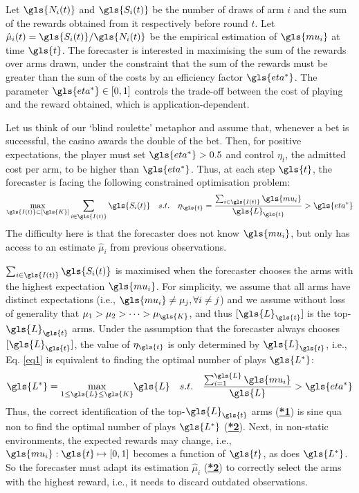 Let $\gls{N_i(t)}$ and $\gls{S_i(t)}$ be the number of draws of arm $i$ and the sum of the rewards obtained from it respectively before round $t$. Let $\hat{\mu}_i(t) = \gls{S_i(t)}/\gls{N_i(t)}$ be the empirical estimation of $\gls{mu_i}$ at time $\gls{t}$. 
The forecaster is interested in maximising the sum of the rewards over arms drawn, under the constraint that the sum of the rewards must be greater than the sum of the costs by an efficiency factor $\gls{eta^*}$. The parameter $\gls{eta^*} \in [0,1]$ controls the trade-off between the cost of playing and the reward obtained, which is application-dependent. 

Let us think of our `blind roulette' metaphor and assume that, whenever a bet is successful, the casino awards the double of the bet. Then, for positive expectations, the player must set $\gls{eta^*} > 0.5$ and control $\eta_t$, the admitted cost per arm, to be higher than $\gls{eta^*}$. Thus, at each step $\gls{t}$, the forecaster is facing the following constrained optimisation problem: 
\begin{equation}
\underset{\gls{I(t)} \subset [\gls{K}]}{\max} \sum_{i \in \gls{I(t)}} \gls{S_i(t)} \quad s.t. \quad \eta_{\gls{t}} = \frac{\sum_{i \in \gls{I(t)}} \gls{mu_i}}{\gls{L}_{\gls{t}}}  > \gls{eta^*} 
\label{eq1}
\end{equation} 
The difficulty here is that the forecaster does not know $\gls{mu_i}$, but only has access to an estimate $\hat{\mu}_i$ from previous observations. 

$\sum_{i \in \gls{I(t)}} \gls{S_i(t)} $ is maximised when the forecaster chooses the arms with the highest expectation $\gls{mu_i}$. 
For simplicity, we assume that all arms have distinct expectations (i.e., $\gls{mu_i} \neq \mu_j, \forall i \neq j$) and we assume without loss of generality that $\mu_1 > \mu_2 > \dots > \mu_{\gls{K}}$, and thus $[\gls{L}_{\gls{t}}]$ is the top-$\gls{L}_{\gls{t}}$ arms. Under the assumption that the forecaster always chooses $[\gls{L}_{\gls{t}}]$, the value of $\eta_{\gls{t}}$ is only determined by $\gls{L}_{\gls{t}}$, i.e., Eq. \eqref{eq1} is equivalent to finding the optimal number of plays $\gls{L^*}$:
\begin{equation} \label{eq2}
\gls{L^*} = \underset{{1 \leq \gls{L} \leq \gls{K}}}{\max}{\gls{L}} \quad s.t. \quad \frac{\sum_{i=1}^{\gls{L}} \gls{mu_i}}{\gls{L}} > \gls{eta^*}
\end{equation}
Thus, the correct identification of the top-$\gls{L}_{\gls{t}}$ arms (\hyperlink{*1}{\textbf{*1}}) is sine qua non to find the optimal number of plays $\gls{L^*}$ (\hyperlink{*2}{\textbf{*2}}).
Next, in non-static environments, the expected rewards may change, i.e., $\gls{mu_i}: \gls{t} \mapsto [0,1]$ becomes a function of $\gls{t}$, as does $\gls{L^*}$. 
So the forecaster must adapt its estimation $\hat{\mu}_i$ (\hyperlink{*3}{\textbf{*2}}) to correctly select the arms with the highest reward, i.e., it needs to discard outdated observations. 

